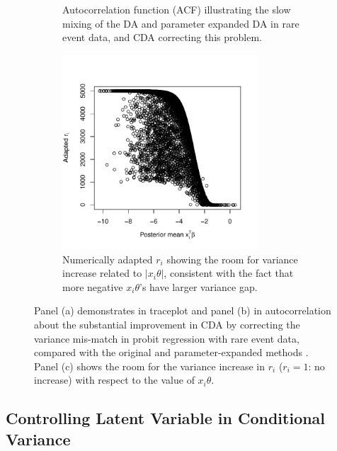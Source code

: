 \documentclass[10pt]{article}
\newcommand{\xbeta}{ x_i \theta}
\begin{document}
\begin{figure}[H]
\begin{subfigure}[b]{0.32\textwidth}
  \caption{Autocorrelation function (ACF) illustrating the slow mixing of the DA and parameter expanded DA in rare event data, and CDA correcting this problem.}
    \label{probit_reg_acf}
\end{subfigure}
  \hfill
   \begin{subfigure}[b]{0.30\textwidth}
 \includegraphics[width=0.8\textwidth]{probit_cda_r}
  \caption{Numerically adapted $r_i$ showing the room for variance increase related to $|\xbeta|$, consistent with the fact that more negative $\xbeta$'s have larger variance gap.}
    \label{probit_reg_r}
\end{subfigure}
 \caption{Panel (a) demonstrates in traceplot and panel (b) in autocorrelation about the substantial improvement in CDA by correcting the variance mis-match in probit regression with rare event data, compared with the original \citep{albert1993bayesian} and parameter-expanded methods \citep{liu1999parameter}. Panel (c) shows the room for the variance increase in $r_i$ ($r_i=1$: no increase) with respect to the value of $\xbeta$.}
 \end{figure}

\subsection{Controlling Latent Variable in Conditional Variance}
\end{document}
